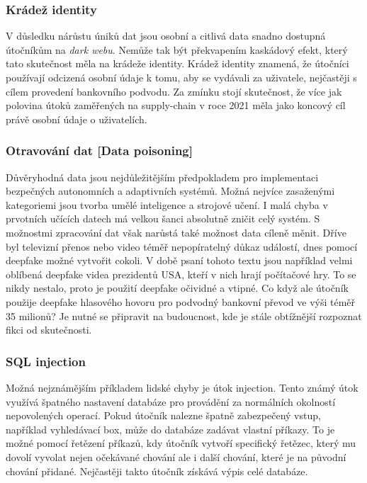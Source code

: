 \subsubsection{Krádež identity}
V důsledku nárůstu úniků dat jsou osobní a citlivá data snadno dostupná útočníkům na \textit{dark webu}.
Nemůže tak být překvapením kaskádový efekt, který tato skutečnost měla na krádeže identity.
Krádež identity znamená, že útočníci používají odcizená osobní údaje k tomu, aby se vydávali za uživatele, nejčastěji s cílem provedení bankovního podvodu.
Za zmínku stojí skutečnost, že více jak polovina útoků zaměřených na supply-chain v roce 2021 měla jako koncový cíl právě osobní údaje o uživatelích.

\subsubsection{Otravování dat [Data poisoning]}
Důvěryhodná data jsou nejdůležitějším předpokladem pro implementaci bezpečných autonomních a adaptivních systémů.
Možná nejvíce zasaženými kategoriemi jsou tvorba umělé inteligence a strojové učení.
I malá chyba v prvotních učících datech má velkou šanci absolutně zničit celý systém.
S možnostmi zpracování dat však narůstá také možnost data cíleně měnit.
Dříve byl televizní přenos nebo video téměř nepopíratelný důkaz událostí, dnes pomocí deepfake možné vytvořit cokoli.
V době psaní tohoto textu jsou například velmi oblíbená deepfake videa prezidentů USA, kteří v nich hrají počítačové hry.
To se nikdy nestalo, proto je použití deepfake očividné a vtipné.
Co když ale útočník použije deepfake hlasového hovoru pro podvodný bankovní převod ve výši téměř 35 milionů?
Je nutné se připravit na budoucnost, kde je stále obtížnější rozpoznat fikci od skutečnosti.\cite{Enisa_thread_landscape}

\subsubsection{SQL injection}
Možná nejznámějším příkladem lidské chyby je útok  injection.
Tento známý útok využívá špatného nastavení databáze pro provádění za normálních okolností nepovolených operací.
Pokud útočník nalezne špatně zabezpečený vstup, například vyhledávací box, může do databáze zadávat vlastní příkazy.
To je možné pomocí řetězení příkazů, kdy útočník vytvoří specifický řetězec, který mu dovolí vyvolat nejen očekávané chování ale i další chování, které je na původní chování přidané.
Nejčastěji takto útočník získává výpis celé databáze.\cite{cisco_most_common_attack}


